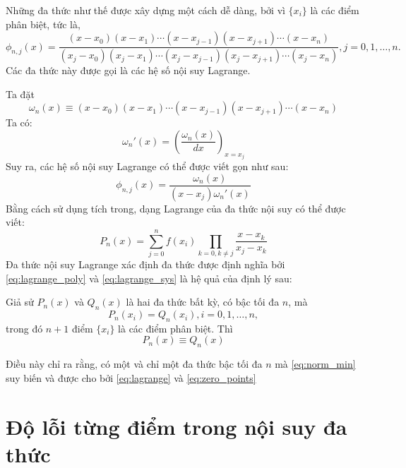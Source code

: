 Những đa thức như thế được xây dựng một cách dễ dàng, bởi vì $\{x_i\}$ là các điểm phân biệt, tức là, 
\begin{equation}
    \label{eq:zero_points}
    \phi_{n, j}(x) = \frac{(x-x_0)(x-x_1)\cdots(x-x_{j-1})(x-x_{j+1})\cdots(x-x_n)}{(x_j-x_0)(x_j-x_1)\cdots(x_j-x_{j-1})(x_j-x_{j+1})\cdots(x_j-x_n)}, j = 0, 1, \dots, n.
\end{equation}
Các đa thức này được gọi là các hệ số nội suy Lagrange.

Ta đặt
\begin{equation}
    \omega_n(x) \equiv (x-x_0)(x-x_1)\cdots(x-x_{j-1})(x-x_{j+1})\cdots(x-x_n)
\end{equation}
Ta có:
\begin{equation}
   \omega_n'(x) = \left(\frac{\omega_n(x)}{dx}\right)_{x= x_j} 
\end{equation}
Suy ra, các hệ số nội suy Lagrange có thể được viết gọn như sau:
\begin{equation}
    \phi_{n,j}(x) = \frac{\omega_n(x)}{(x-x_j)\omega_n'(x)}
\end{equation}
Bằng cách sử dụng tích trong, dạng Lagrange của đa thức nội suy có thể được viết:
\begin{equation}
    \label{eq:lagrange}
    P_n(x) = \sum_{j = 0}^{n}f(x_i)\prod_{k = 0, k \ne j}\frac{x-x_k}{x_j - x_k}
\end{equation}
Đa thức nội suy Lagrange xác định đa thức được định nghĩa bởi \eqref{eq:lagrange_poly} và \eqref{eq:lagrange_sys} là hệ quả của định lý sau:
\begin{theorem}
    Giả sử $P_n(x)$ và $Q_n(x)$ là hai đa thức bất kỳ, có bậc tối đa $n$, mà
    \begin{equation}
        P_n(x_i) = Q_n(x_i), i = 0, 1, \dots, n,
    \end{equation}
    trong đó $n+1$ điểm $\{x_i\}$ là các điểm phân biệt. Thì
    \begin{equation}
        P_n(x) \equiv Q_n(x)
    \end{equation}
\end{theorem}
Điều này chỉ ra rằng, có một và chỉ một đa thức bậc tối đa $n$ mà \eqref{eq:norm_min} suy biến và được cho bởi \eqref{eq:lagrange} và \eqref{eq:zero_points}

\section{Độ lỗi từng điểm trong nội suy đa thức}

